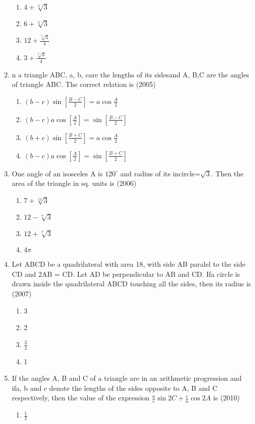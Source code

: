 \documentclass[12pt]{article}
\providecommand{\sbrak}[1]{\ensuremath{{}\left[#1\right]}}
\begin{document}
\begin{enumerate}
\begin{enumerate}
\item $4+\sqrt[2]{3}$
\item $6+\sqrt[2]{3}$
\item $12+\frac{\sqrt[7]{3}}{4}$
\item $3+\frac{\sqrt[7]{3}}{4}$
\end{enumerate}
\item n a triangle ABC, a, b, care the lengths of its sidesand A, B,C are the angles of triangle ABC. The correct relation is  (2005)
\begin{enumerate}
\item  $(b-c)\sin\sbrak{\frac{B-C}{2}}=a\cos\frac{A}{2}$
\item  $(b-c)a\cos\sbrak{\frac{A}{2}}=\sin\sbrak{\frac{B-C}{2}}$
\item  $(b+c)\sin\sbrak{\frac{B+C}{2}}=a\cos\frac{A}{2}$
\item  $(b-c)a\cos\sbrak{\frac{A}{2}}=\sin\sbrak{\frac{B+C}{2}}$
\end{enumerate}
\item One angle of an isosceles A is $120^\circ$ and radius of its incircle=$\sqrt{3}$. Then the area of the triangle in sq. units is (2006)
\begin{enumerate}
\item $7+\sqrt[12]{3}$
\item $12-\sqrt[7]{3}$
\item $12+\sqrt[7]{3}$
\item $4\pi$
\end{enumerate}
\item Let ABCD be a quadrilateral with area 18, with side AB paralel to the side CD and 2AB = CD. Let AD be perpendicular to AB and CD. Ifa circle is drawn inside the quadrilateral ABCD touching all the sides, then its radius is (2007)
\begin{enumerate}
\item 3
\item 2
\item $\frac{3}{2}$
\item 1
\end{enumerate}
\item If the angles A, B and C of a triangle are in an arithmetic progression and ifa, b and c denote the lengths of the sides opposite to A, B and C respectively, then the value of the expression $\frac{a}{c}\sin 2C+\frac{c}{a}\cos 2A$ is (2010)
\begin{enumerate}
\item $\frac{1}{2}$

\end{enumerate}
\end{enumerate}
\end{document}
